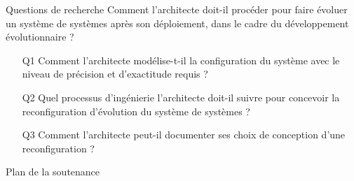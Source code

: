 
\begin{frame}{Questions de recherche}
Comment l’architecte doit-il procéder pour faire évoluer un système de systèmes après son déploiement, dans le cadre du développement évolutionnaire ?\\
\begin{itemize}
    \item[Q1] Comment l’architecte modélise-t-il la configuration du système avec le niveau de précision et d’exactitude requis ?
    \item[Q2] Quel processus d’ingénierie l’architecte doit-il suivre pour concevoir la reconfiguration d’évolution du système de systèmes ?
    \item[Q3] Comment l’architecte peut-il documenter ses choix de conception d’une reconfiguration ?
\end{itemize}
\end{frame}

\begin{frame}{Plan de la soutenance}
\tableofcontents
\end{frame}

